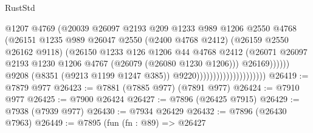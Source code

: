 \begin{lexlean}{RustStd}
\begin{coremodule}
                                                    @1207
                                                    @4769
                                                    (@20039
                                                      @26097
                                                      @2193
                                                      @209
                                                      @1233
                                                      @989
                                                      @1206
                                                      @2550
                                                      @4768
                                                      (@26151
                                                        @1235
                                                        @989
                                                        @26047
                                                        @2550
                                                        (@2400 @4768 @2412)
                                                        (@26159 @2550 @26162 @9118)
                                                        (@26150
                                                          @1233
                                                          @126
                                                          @1206
                                                          @44
                                                          @4768
                                                          @2412
                                                          (@26071
                                                            @26097
                                                            @2193
                                                            @1230
                                                            @1206
                                                            @4767
                                                            (@26079 (@26080 @1230 @1206)))
                                                          @26169))))))
                                              @9208
                                              (@8351 (@9213 @1199 @1247 @385))
                                              @9220)))))))))))))))))))))
@26419 := @7879 @977
@26423 := @7881 (@7885 @977) (@7891 @977)
@26424 := @7910 @977
@26425 := @7900 @26424
@26427 := @7896 (@26425 @7915)
@26429 := @7938 (@7939 @977)
@26430 := @7934 @26429
@26432 := @7896 (@26430 @7963)
@26449 := @7895
    (fun (fn : @89) =>
    @26427

\end{coremodule}
\end{lexlean}
